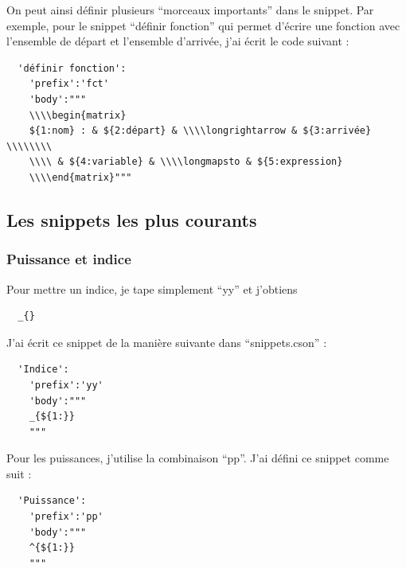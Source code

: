 \documentclass[french]{article}
\theoremstyle{definition}
\theoremstyle{remark}
\begin{document}
On peut ainsi définir plusieurs ``morceaux importants'' dans le snippet. Par exemple, pour le snippet ``définir fonction'' qui permet d'écrire une fonction avec l'ensemble de départ et l'ensemble d'arrivée, j'ai écrit le code suivant :

\begin{verbatim}
  'définir fonction':
    'prefix':'fct'
    'body':"""
    \\\\begin{matrix}
    ${1:nom} : & ${2:départ} & \\\\longrightarrow & ${3:arrivée} \\\\\\\\
    \\\\ & ${4:variable} & \\\\longmapsto & ${5:expression}
    \\\\end{matrix}"""
\end{verbatim}

\subsection{Les snippets les plus courants}

\subsubsection{Puissance et indice}

Pour mettre un indice, je tape simplement ``yy'' et j'obtiens

\begin{verbatim}
  _{}
\end{verbatim}

J'ai écrit ce snippet de la manière suivante dans ``snippets.cson'' :

\begin{verbatim}
  'Indice':
    'prefix':'yy'
    'body':"""
    _{${1:}}
    """
\end{verbatim}

Pour les puissances, j'utilise la combinaison ``pp''. J'ai défini ce snippet comme suit :

\begin{verbatim}
  'Puissance':
    'prefix':'pp'
    'body':"""
    ^{${1:}}
    """
\end{verbatim}
\end{document}
